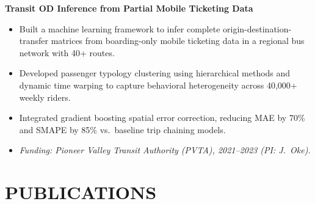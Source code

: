 \documentclass[10pt, a4paper]{article}
\begin{document}
\vspace{4pt}
\textbf{Transit OD Inference from Partial Mobile Ticketing Data}
\begin{itemize}
  \item Built a machine learning framework to infer complete origin-destination-transfer matrices from boarding-only mobile ticketing data in a regional bus network with 40+ routes.
  \item Developed passenger typology clustering using hierarchical methods and dynamic time warping to capture behavioral heterogeneity across 40,000+ weekly riders.
  \item Integrated gradient boosting spatial error correction, reducing MAE by 70\% and SMAPE by 85\% vs.\ baseline trip chaining models.
  \item \textit{Funding: Pioneer Valley Transit Authority (PVTA), 2021--2023 (PI: J.~Oke).}
\end{itemize}

\section{PUBLICATIONS}
\end{document}
